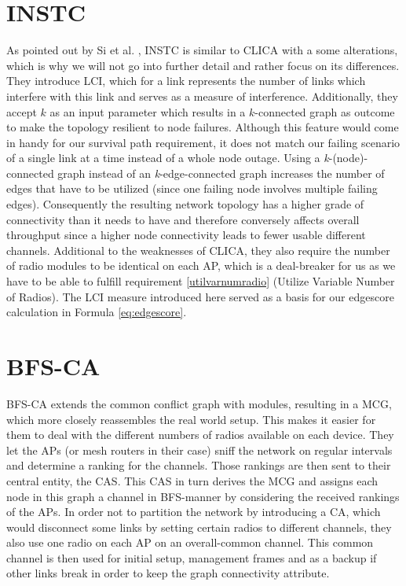   \section{\ac{INSTC}}
    As pointed out by Si et al. \cite{overview_caa}, \ac{INSTC} \cite{INSTC} is similar to \ac{CLICA} \cite{CLICA} with a some alterations, 
    which is why we will not go into further detail and rather focus on its differences. 
    They introduce \ac{LCI}, which for a link represents the number of links which interfere with this link \cite{overview_caa} and serves as a measure of 
    interference. Additionally, they accept \(k\) as an input parameter which results in a \(k\)-connected graph as outcome to make the topology resilient to node failures.
    Although this feature would come in handy for our survival path requirement, it does not match our failing scenario of a single link at a time instead of a whole node outage.
    Using a \textit{k}-(node)-connected graph instead of an \textit{k}-edge-connected graph increases the number of edges that have to be utilized 
    (since one failing node involves multiple failing edges). Consequently the resulting network topology has a higher grade of connectivity than it needs to 
    have and therefore conversely affects overall throughput since a higher node connectivity leads to fewer usable different channels. 
    Additional to the weaknesses of \ac{CLICA}, they also require the number of radio modules to be identical on each \ac{AP}, 
    which is a deal-breaker for us as we have to be able to fulfill requirement \ref{utilvarnumradio} (Utilize Variable Number of Radios).
    The \ac{LCI} measure introduced here served as a basis for our edgescore calculation in Formula \ref{eq:edgescore}.
    
  \section{\ac{BFS-CA}}
    \ac{BFS-CA} \cite{BFS-CA} extends the common conflict graph with modules, resulting in a \ac{MCG}, which more closely reassembles the
    real world setup. This makes it easier for them to deal with the different numbers of radios available on each device. 
    They let the APs (or mesh routers in their case) sniff the network on regular intervals and determine a ranking for the channels.
    Those rankings are then sent to their central entity, the \ac{CAS}. This \ac{CAS} in turn derives the \ac{MCG} and assigns each node in this graph 
    a channel in \ac{BFS}-manner by considering the received rankings of the APs. In order not to partition the network by introducing a \ac{CA}, which 
    would disconnect some links by setting certain radios to different channels, they also use one radio on each AP on an overall-common channel.
    This common channel is then used for initial setup, management frames and as a backup if other links break in order to keep the graph connectivity attribute.
    
